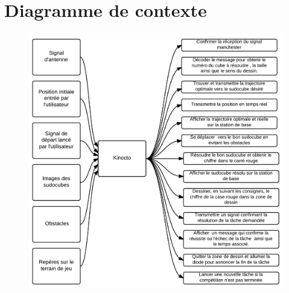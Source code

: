 


\chapter{Diagramme de contexte}
\label{s:contexte}
\begin{figure}[htb]
\centering
\includegraphics[scale=0.38]{fig/DiagrammeDeContexteDesign3.png}
\end{figure}
